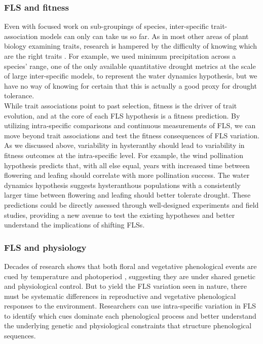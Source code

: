 \documentclass{article}
\begin{document}
\subsubsection*{FLS and fitness}
Even with focused work on sub-groupings of species, inter-specific trait-association models can only can take us so far. As in most other areas of plant biology examining traits, research is hampered by the difficulty of knowing which are the right traits \citep{Violle2007}. For example, we used minimum precipitation across a species' range, one of the only available quantitative drought metrics at the scale of large inter-specific models, to represent the water dynamics hypothesis, but we have no way of knowing for certain that this is actually a good proxy for drought tolerance. \\

\noindent While trait associations point to past selection, fitness is the driver of trait evolution, and at the core of each FLS hypothesis is a fitness prediction. By utilizing intra-specific comparisons and continuous measurements of FLS, we can move beyond trait associations and test the fitness consequences of FLS variation. As we discussed above, variability in hysteranthy should lead to variability in fitness outcomes at the intra-specific level. For example, the wind pollination hypothesis predicts that, with all else equal, years with increased time between flowering and leafing should correlate with more pollination success. The water dynamics hypothesis suggests hysteranthous populations with a consistently larger time between flowering and leafing should better tolerate drought. These predictions could be directly assessed through well-designed experiments and field studies, providing a new avenue to test the existing hypotheses and better understand the implications of shifting FLSs.\\

\subsubsection*{FLS and physiology} 
Decades of research shows that both floral and vegetative phenological events are cued by temperature and photoperiod \citep{Forrest2010, Flynn2018}, suggesting they are under shared genetic and physiological control. But to yield the FLS variation seen in nature, there must be systematic differences in reproductive and vegetative phenological responses to the environment. Researchers can use intra-specific variation in FLS to identify which cues dominate each phenological process and better understand the underlying genetic and physiological constraints that structure phenological sequences.\\
\end{document}
